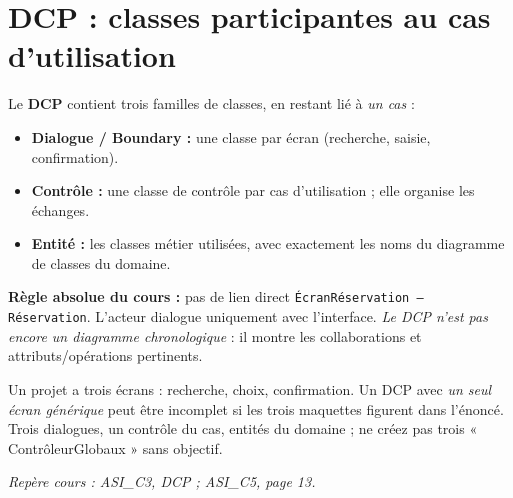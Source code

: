 \documentclass[10pt,a4paper]{article}
\newcommand{\source}[1]{\par{\footnotesize\color{bodygray}\textit{Repère cours : #1}}}
\begin{document}
\section{DCP : classes participantes au cas d'utilisation}
Le \textbf{DCP} contient trois familles de classes, en restant lié à \emph{un cas} :
\begin{itemize}
\item \textbf{Dialogue / Boundary :} une classe par écran (recherche, saisie, confirmation).
\item \textbf{Contrôle :} une classe de contrôle par cas d'utilisation ; elle organise les échanges.
\item \textbf{Entité :} les classes métier utilisées, avec exactement les noms du diagramme de classes du domaine.
\end{itemize}
\begin{center}
\end{center}
\textbf{Règle absolue du cours :} pas de lien direct \texttt{ÉcranRéservation -- Réservation}. L'acteur dialogue uniquement avec l'interface. \emph{Le DCP n'est pas encore un diagramme chronologique} : il montre les collaborations et attributs/opérations pertinents.
\begin{exobox}
Un projet a trois écrans : recherche, choix, confirmation. Un DCP avec \emph{un seul écran générique} peut être incomplet si les trois maquettes figurent dans l'énoncé. Trois dialogues, un contrôle du cas, entités du domaine ; ne créez pas trois « ContrôleurGlobaux » sans objectif.
\end{exobox}
\source{ASI\_C3, DCP ; ASI\_C5, page 13.}
\end{document}
